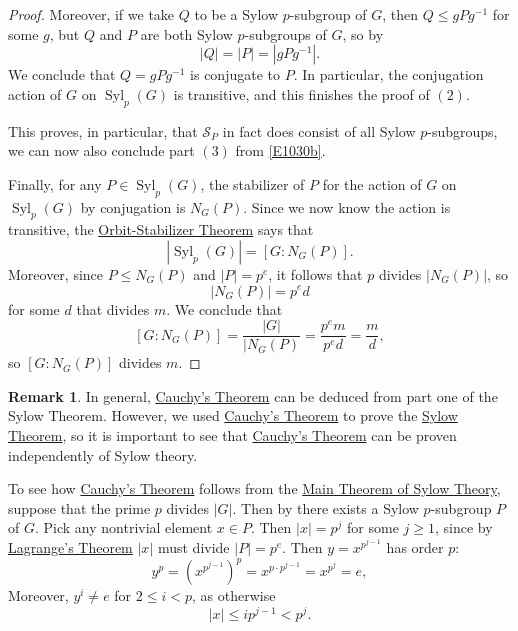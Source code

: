 \documentclass[12pt]{report}
\numberwithin{equation}{section}
\numberwithin{theorem}{chapter}
\theoremstyle{definition}
\newtheorem*{basic properties}{Basic Properties}
\newtheorem*{Important Remark}{Important Remark}
\newtheorem{remark}[theorem]{Remark}
\newcommand{\cS}{\mathcal{S}}
\DeclareMathOperator{\Syl}{Syl}
\begin{document}
\begin{proof}
Moreover, if we take $Q$ to be a Sylow $p$-subgroup of $G$, then $Q \leq gPg^{-1}$ for some $g$, but $Q$ and $P$ are both Sylow $p$-subgroups of $G$, so by 
$$|Q| = |P| = |gPg^{-1}|.$$
We conclude that $Q = gPg^{-1}$ is conjugate to $P$. In particular, the conjugation action of $G$ on $\Syl_p(G)$ is transitive, and this finishes the proof of $(2)$.


This proves, in particular, that $\cS_P$ in fact does consist of all Sylow $p$-subgroups, we can now also conclude part $(3)$ from \eqref{E1030b}.

Finally, for any $P \in \Syl_p(G)$, the stabilizer of $P$ for the action of $G$ on $\Syl_p(G)$ by conjugation is $N_G(P)$. Since we now know the action is transitive, the \hyperref[Orbit-Stabilizer Theorem]{Orbit-Stabilizer Theorem} says that
$$|\Syl_p(G)| = [G: N_G(P)].$$
Moreover, since $P \leq N_G(P)$ and $|P| = p^e$, it follows that $p$ divides $|N_G(P)|$, so
$$|N_G(P)| = p^e d$$
for some $d$ that divides $m$. We conclude that
$$[G: N_G(P)] = \frac{|G|}{|N_G(P)} = \frac{p^em}{p^ed} = \frac{m}{d},$$
so $[G: N_G(P)]$ divides $m$.
\end{proof}



\begin{remark} 
In general, \hyperref[Cauchy's Theorem]{Cauchy's Theorem} can be deduced from part one of the Sylow Theorem. However, we used \hyperref[Cauchy's Theorem]{Cauchy's Theorem} to prove the \hyperref[Sylow]{Sylow Theorem}, so it is important to see that \hyperref[Cauchy's Theorem]{Cauchy's Theorem} can be proven independently of Sylow theory.

To see how \hyperref[Cauchy's Theorem]{Cauchy's Theorem} follows from the \hyperref[Sylow]{Main Theorem of Sylow Theory}, suppose that the prime $p$ divides $|G|$. Then by   there exists a Sylow $p$-subgroup $P$ of $G$. Pick any nontrivial element $x \in P$. Then $|x| = p^j$ for some $j \geqslant 1$, since  by \hyperref[Lagrange]{Lagrange's Theorem} $|x|$ must divide $|P| = p^e$. Then $y = x^{p^{j-1}}$ has order $p$:
$$y^p = \left( x^{p^{j-1}} \right)^p  =x^{p \cdot p^{j-1}} = x^{p^{j}} = e,$$
 Moreover, $y^i \neq e$ for $2 \leqslant i < p$, as otherwise 
 $$|x| \leqslant ip^{j-1} < p^j.$$

\end{remark}
\end{document}
